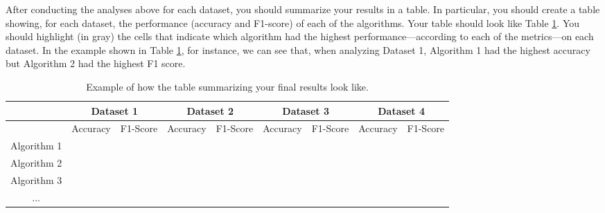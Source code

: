 \documentclass[letterpaper]{article}
\begin{document}
After conducting the analyses above for each dataset, you should summarize your results in a table. In particular, you should create a table showing, for each dataset, the performance (accuracy and F1-score) of each of the algorithms. Your table should look like Table \ref{fig:results_table}. You should highlight (in gray) the cells that indicate which algorithm had the highest performance---according to each of the metrics---on each dataset. In the example shown in Table \ref{fig:results_table}, for instance, we can see that, when analyzing Dataset 1, Algorithm 1 had the highest accuracy but Algorithm 2 had the highest F1 score.


\begin{table}[h!]
	\centering
	\begin{tabular}{|c|cc|cc|cc|cc|}
		\hline
		            & \multicolumn{2}{c|}{Dataset 1}                & \multicolumn{2}{c|}{Dataset 2} & \multicolumn{2}{c|}{Dataset 3}                & \multicolumn{2}{c|}{Dataset 4}                                                                                                                                                       \\ \hline
		            & \multicolumn{1}{c|}{Accuracy}                 & F1-Score                       & \multicolumn{1}{c|}{Accuracy}                 & F1-Score                       & \multicolumn{1}{c|}{Accuracy}                 & F1-Score                 & \multicolumn{1}{c|}{Accuracy}                 & F1-Score                 \\ \hline
		Algorithm 1 & \multicolumn{1}{c|}{\cellcolor[HTML]{C0C0C0}} &                                & \multicolumn{1}{c|}{}                         &                                & \multicolumn{1}{c|}{}                         & \cellcolor[HTML]{C0C0C0} & \multicolumn{1}{c|}{}                         &                          \\ \hline
		Algorithm 2 & \multicolumn{1}{c|}{}                         & \cellcolor[HTML]{C0C0C0}       & \multicolumn{1}{c|}{}                         &                                & \multicolumn{1}{c|}{}                         &                          & \multicolumn{1}{c|}{\cellcolor[HTML]{C0C0C0}} & \cellcolor[HTML]{C0C0C0} \\ \hline
		Algorithm 3 & \multicolumn{1}{c|}{}                         &                                & \multicolumn{1}{c|}{\cellcolor[HTML]{C0C0C0}} & \cellcolor[HTML]{C0C0C0}       & \multicolumn{1}{c|}{}                         &                          & \multicolumn{1}{c|}{}                         &                          \\ \hline
		...         & \multicolumn{1}{c|}{}                         &                                & \multicolumn{1}{c|}{}                         &                                & \multicolumn{1}{c|}{\cellcolor[HTML]{C0C0C0}} &                          & \multicolumn{1}{c|}{}                         &                          \\ \hline
	\end{tabular}
	\caption{Example of how the table summarizing your final results look like.}
	\label{fig:results_table}
\end{table}
\end{document}
